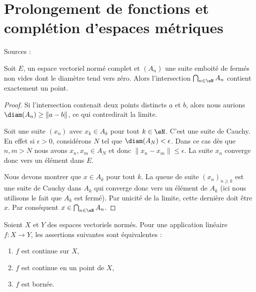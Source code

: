 \section{Prolongement de fonctions et complétion d'espaces métriques}

Sources : \cite{RasclAnaFonc,MaurayAnalSpec}

\begin{lemma}   \label{LemdCOMQM}
    Soit \( E\), un espace vectoriel normé complet et \( (A_n)\) une suite emboité de fermés non vides dont le diamètre tend vers zéro. Alors l'intersection \( \bigcap_{n\in \eN}A_n\) contient exactement un point.
\end{lemma}

\begin{proof}
    Si l'intersection contenait deux points distincts \( a\) et \( b\), alors nous aurions \( \diam(A_n)\geq\| a-b \|\), ce qui contredirait la limite.

    Soit une suite \( (x_n)\) avec \( x_k\in A_k\) pour tout \( k\in \eN\). C'est une suite de Cauchy. En effet si \( \epsilon>0\), considérons \( N\) tel que \( \diam(A_N)<\epsilon\). Dans ce cas dès que \( n,m>N\) nous avons \( x_n,x_m\in A_{N}\) et donc \( \| x_n-x_m \|\leq \epsilon\). La suite \( x_n\) converge donc vers un élément dans \( E\).

    Nous devons montrer que \( x\in A_k\) pour tout \( k\). La queue de suite \( (x_n)_{n\geq k}\) est une suite de Cauchy dans \( A_k\) qui converge donc vers un élément de \( A_k\) (ici nous utilisons le fait que \( A_k\) est fermé). Par unicité de la limite, cette dernière doit être \( x\). Par conséquent \( x\in\bigcap_{n\in \eN}A_n\).
\end{proof}

\begin{theorem}      \label{ThoCaMpKO}
    Soient \( X\) et \( Y\) des espaces vectoriels normés. Pour une application linéaire \( f\colon X\to Y\), les assertions suivantes sont équivalentes :
    \begin{enumerate}
        \item
            \( f\) est continue sur \( X\),
        \item
            \( f\) est continue en un point de \( X\),
        \item
            \( f\) est bornée.
    \end{enumerate}
\end{theorem}

